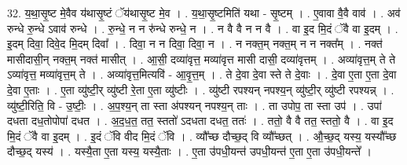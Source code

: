 \documentclass[17pt]{extarticle}
\begin{document}
32. य॒था॒सृ॒ष्ट मे॒वैव य॑थासृ॒ष्टं ॅय॑थासृ॒ष्ट मे॒व । . य॒था॒सृ॒ष्टमिति॑ यथा - सृ॒ष्टम् । . ए॒वावा वै॒वै वाव॑ । . अव॑ रुन्धे रु॒न्धे ऽवाव॑ रुन्धे । . रु॒न्धे॒ न न रु॑न्धे रुन्धे॒ न । . न वै वै न न वै । . वा इ॒द मि॒दं ॅवै वा इ॒दम् । . इ॒दम् दिवा॒ दिवे॒द मि॒दम् दिवा᳚ । . दिवा॒ न न दिवा॒ दिवा॒ न । . न नक्त॒म् नक्त॒म् न न नक्त᳚म् । . नक्त॑ मासीदासी॒न् नक्त॒म् नक्त॑ मासीत् । . आ॒सी॒ दव्या॑वृत्त॒ मव्या॑वृत्त मासी दासी॒ दव्या॑वृत्तम् । . अव्या॑वृत्त॒म् ते ते ऽव्या॑वृत्त॒ मव्या॑वृत्त॒म् ते । . अव्या॑वृत्त॒मित्यवि॑ - आ॒वृ॒त्त॒म् । . ते दे॒वा दे॒वा स्ते ते दे॒वाः । . दे॒वा ए॒ता ए॒ता दे॒वा दे॒वा ए॒ताः । . ए॒ता व्यु॑ष्टी॒र् व्यु॑ष्टी रे॒ता ए॒ता व्यु॑ष्टीः । . व्यु॑ष्टी रपश्यन् नपश्य॒न् व्यु॑ष्टी॒र् व्यु॑ष्टी रपश्यन्न् । . व्यु॑ष्टी॒रिति॒ वि - उ॒ष्टीः॒ । . अ॒प॒श्य॒न् ता स्ता अ॑पश्यन् नपश्य॒न् ताः । . ता उपोप॒ ता स्ता उप॑ । . उपा॑ दधता दध॒तोपोपा॑ दधत । . अ॒द॒ध॒त॒ तत॒ स्ततो॑ ऽदधता दधत॒ ततः॑ । . ततो॒ वै वै तत॒ स्ततो॒ वै । . वा इ॒द मि॒दं ॅवै वा इ॒दम् । . इ॒दं ॅवि वीद मि॒दं ॅवि । . व्यौ᳚च्छ दौच्छ॒द् वि व्यौ᳚च्छत् । . औ॒च्छ॒द् यस्य॒ यस्यौ᳚च्छ दौच्छ॒द् यस्य॑ । . यस्यै॒ता ए॒ता यस्य॒ यस्यै॒ताः । . ए॒ता उ॑पधी॒यन्त॑ उपधी॒यन्त॑ ए॒ता ए॒ता उ॑पधी॒यन्ते᳚ । \newline
\end{document}
